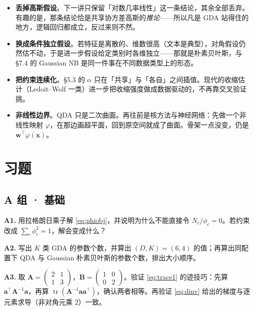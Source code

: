\documentclass[11pt,a4paper,fontset=windows,zihao=-4]{ctexart}
\newcommand{\bw}{\mathbf{w}}
\newcommand{\bx}{\mathbf{x}}
\newcommand{\ba}{\mathbf{a}}
\newcommand{\bA}{\mathbf{A}}
\newcommand{\bB}{\mathbf{B}}
\newcommand{\tp}{^{\top}}
\DeclareMathOperator{\tr}{tr}
\begin{document}
\begin{itemize}
  \item \textbf{丢掉高斯假设}。下一讲只保留「对数几率线性」这一条结论，其余全部丢弃。有趣的是，那条结论恰是共享协方差高斯的\emph{推论}——所以凡是 GDA 站得住的地方，逻辑回归都成立，反过来则不然。
  \item \textbf{换成条件独立假设}。若特征是离散的、维数很高（文本是典型），对角假设仍然估不动，于是进一步假设给定类别时各维独立——那就是朴素贝叶斯，与 §7.4 的 Gaussian NB 是同一件事在不同数据类型上的形态。
  \item \textbf{把约束连续化}。§5.3 的 $\alpha$ 只在「共享」与「各自」之间插值。现代的收缩估计（Ledoit–Wolf 一类）进一步把收缩强度做成数据驱动的，不再靠交叉验证挑。
  \item \textbf{非线性边界}。QDA 只是二次曲面。再往前是核方法与神经网络：先做一个非线性映射 $\varphi$，在那边画超平面，回到原空间就成了曲面。骨架一点没变，仍是 $\bw\tp\varphi(\bx)$。
\end{itemize}


\clearpage
\section*{习题}
\setlength{\parskip}{0.62em}

\subsection*{A 组 · 基础}

\noindent\textbf{A1.} 用拉格朗日乘子解 \eqref{eq:phiobj}，并说明为什么不能直接令 $N_c/\phi_c=0$。若约束改成 $\sum_c\phi_c^2=1$，解会变成什么？

\noindent\textbf{A2.} 写出 $K$ 类 GDA 的参数个数，并算出 $(D,K)=(6,4)$ 的值；再算出同配置下 QDA 与 Gaussian 朴素贝叶斯的参数个数，排出大小顺序。

\noindent\textbf{A3.} 取 $\bA=\begin{pmatrix}2&1\\1&3\end{pmatrix}$，$\bB=\begin{pmatrix}1&0\\0&2\end{pmatrix}$。验证 \eqref{eq:trace1} 的迹技巧：先算 $\ba\tp\bA^{-1}\ba$，再算 $\tr(\bA^{-1}\ba\ba\tp)$，确认两者相等。再验证 \eqref{eq:dinv} 给出的梯度与逐元素求导（非对角元乘 $2$）一致。
\end{document}
